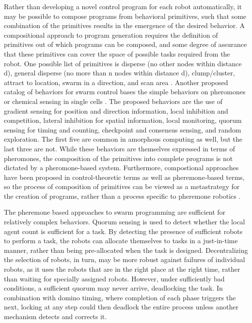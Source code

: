 \documentclass[]{article}
\begin{document}
Rather than developing a novel control program for each robot automatically, it may be possible to compose programs from behavioral primitives, such that some combination of the primitives results in the emergence of the desired behavior. 
A compositional approach to program generation requires the definition of primitives out of which programs can be composed, and some degree of assurance that these primitives can cover the space of possible tasks required from the robot. 
One possible list of primitives is disperse (no other nodes within distance d), general disperse (no more than n nodes within distance d), clump/cluster, attract to location, swarm in a direction, and scan area \cite{evans2000programming}.
Another proposed catalog of behaviors for swarm control bases the simple behaviors on pheromones or chemical sensing in single cells \cite{nagpal2004catalog}. 
The proposed behaviors are the use of gradient sensing for position and direction information, local inhibition and competition, lateral inhibition for spatial information, local monitoring, quorum sensing for timing and counting, checkpoint and consensus sensing, and random exploration. 
The first five are common in amorphous computing as well, but the last three are not. %
While these behaviors are themselves expressed in terms of pheromones, the composition of the primitives into complete programs is not dictated by a pheromone-based system.
Furthermore, compostional approaches have been proposed in control-theoretic terms as well as pheremone-based terms, so the process of composition of primitives can be viewed as a metastrategy for the creation of programs, rather than a process specific to pheremone robotics \cite{belta2007symbolic}.

The pheremone based approaches to swarm programming are sufficient for relatively complex behaviors. 
Quorum sensing is used to detect whether the local agent count is sufficient for a task. 
By detecting the presence of sufficient robots to perform a task, the robots can allocate themselves to tasks in a just-in-time manner, rather than being pre-allocated when the task is designed. 
Decentralizing the selection of robots, in turn, may be more robust against failures of individual robots, as it uses the robots that are in the right place at the right time, rather than waiting for specially assigned robots. 
However, under sufficiently bad conditions, a sufficient quorum may never arrive, deadlocking the task. 
In combination with domino timing, where completion of each phase triggers the next, locking at any step could then deadlock the entire process unless another mechanism detects and corrects it.
\end{document}

